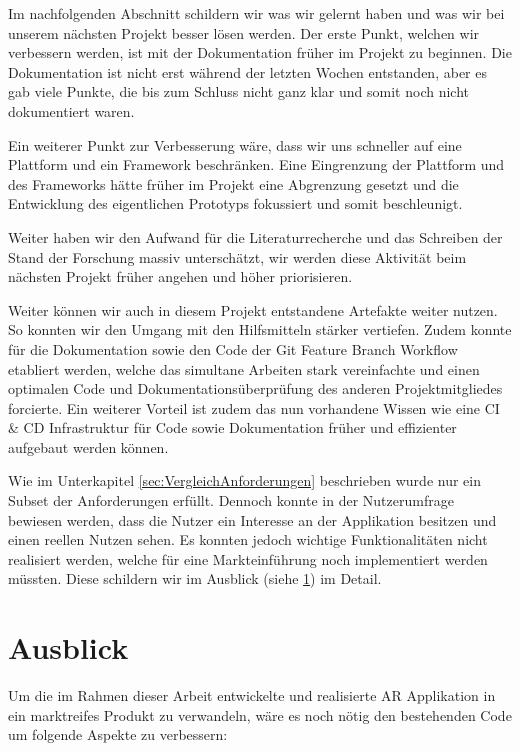 \documentclass[a4paper]{scrreprt}
\begin{document}
Im nachfolgenden Abschnitt schildern wir was wir gelernt haben und was wir bei unserem nächsten Projekt besser lösen werden.
Der erste Punkt, welchen wir verbessern werden, ist mit der Dokumentation früher im Projekt zu beginnen.  Die Dokumentation ist nicht erst während der letzten Wochen entstanden, aber es gab viele Punkte, die bis zum Schluss nicht ganz klar und somit noch nicht dokumentiert waren.

Ein weiterer Punkt zur Verbesserung wäre, dass wir uns schneller auf eine Plattform und ein Framework beschränken. Eine Eingrenzung der Plattform und des Frameworks hätte früher im Projekt eine Abgrenzung gesetzt und die Entwicklung des eigentlichen Prototyps fokussiert und somit beschleunigt.

Weiter haben wir den Aufwand für die Literaturrecherche und das Schreiben der Stand der Forschung massiv unterschätzt, wir werden diese Aktivität beim nächsten Projekt früher angehen und höher priorisieren.

Weiter können wir auch in diesem Projekt entstandene Artefakte weiter nutzen. So konnten wir den Umgang mit den Hilfsmitteln stärker vertiefen. Zudem konnte für die Dokumentation sowie den Code der Git Feature Branch Workflow etabliert werden, welche das simultane Arbeiten stark vereinfachte und einen optimalen Code und Dokumentationsüberprüfung des anderen Projektmitgliedes forcierte. Ein weiterer Vorteil ist zudem das nun vorhandene Wissen wie eine CI \& CD Infrastruktur für Code sowie Dokumentation früher und effizienter aufgebaut werden können.

Wie im Unterkapitel \ref{sec:VergleichAnforderungen} beschrieben wurde nur ein Subset der Anforderungen erfüllt. Dennoch konnte in der Nutzerumfrage bewiesen werden, dass die Nutzer ein Interesse an der Applikation besitzen und einen reellen Nutzen sehen. Es konnten jedoch wichtige Funktionalitäten nicht realisiert werden, welche für eine Markteinführung noch implementiert werden müssten. Diese schildern wir im Ausblick (siehe \ref{sec:Ausblick}) im Detail.

\section{Ausblick}
\label{sec:Ausblick}
Um die im Rahmen dieser Arbeit entwickelte und realisierte AR Applikation in ein marktreifes Produkt zu verwandeln, wäre es noch nötig den bestehenden Code um folgende Aspekte zu verbessern:
\end{document}
